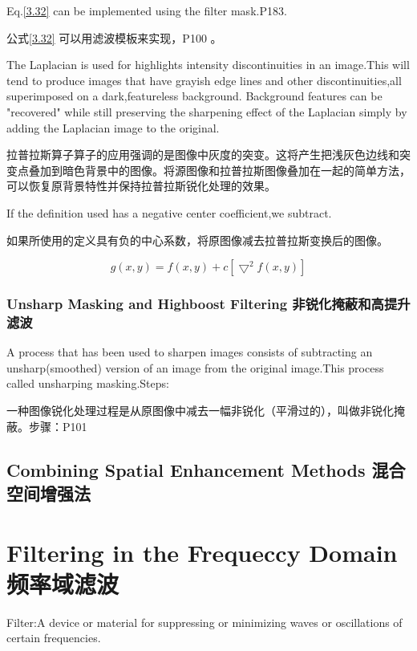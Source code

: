 \documentclass[12pt]{article}
\numberwithin{equation}{section}%
\begin{document}
Eq.\ref{3.32} can be implemented using the filter mask.P183.

公式\ref{3.32} 可以用滤波模板来实现，P100 。

The Laplacian is used for highlights intensity discontinuities in an image.This will tend to produce images that have grayish edge lines and other discontinuities,all superimposed on a dark,featureless background.
Background features can be "recovered" while still preserving the sharpening effect of the Laplacian simply by adding the Laplacian image to the original.

拉普拉斯算子算子的应用强调的是图像中灰度的突变。这将产生把浅灰色边线和突变点叠加到暗色背景中的图像。将源图像和拉普拉斯图像叠加在一起的简单方法，可以恢复原背景特性并保持拉普拉斯锐化处理的效果。

If the definition used has a negative center coefficient,we subtract.

如果所使用的定义具有负的中心系数，将原图像减去拉普拉斯变换后的图像。

\begin{equation} \label{3.33}
g(x,y)=f(x,y)+c[\bigtriangledown^{2}f(x,y)]
\end{equation}

\subsubsection{Unsharp Masking and Highboost Filtering 非锐化掩蔽和高提升滤波}

A process that has been used to sharpen images consists of subtracting an unsharp(smoothed) version of an image from the original image.This process called unsharping masking.Steps:

一种图像锐化处理过程是从原图像中减去一幅非锐化（平滑过的），叫做非锐化掩蔽。步骤：P101

\subsection{Combining Spatial Enhancement Methods 混合空间增强法}




\section{Filtering in the Frequeccy Domain 频率域滤波}

Filter:A device or material for suppressing or minimizing waves or oscillations of certain frequencies.
\end{document}
